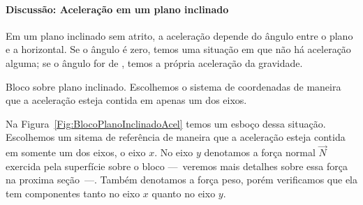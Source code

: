 \paragraph{Discussão: Aceleração em um plano inclinado}

Em um plano inclinado sem atrito, a aceleração depende do ângulo entre o plano e a horizontal. Se o ângulo é zero, temos uma situação em que não há aceleração alguma; se o ângulo for de , temos a própria aceleração da gravidade.

\begin{marginfigure}[-3cm]
\centering
{}
\caption{Bloco sobre plano inclinado. Escolhemos o sistema de coordenadas de maneira que a aceleração esteja contida em apenas um dos eixos.\label{Fig:BlocoPlanoInclinadoAcel}}
\end{marginfigure}

Na Figura~\ref{Fig:BlocoPlanoInclinadoAcel} temos um esboço dessa situação. Escolhemos um sitema de referência de maneira que a aceleração esteja contida em somente um dos eixos, o eixo $x$. No eixo $y$ denotamos a força normal $\vec{N}$ exercida pela superfície sobre o bloco ---~veremos mais detalhes sobre essa força na proxima seção~---. Também denotamos a força peso, porém verificamos que ela tem componentes tanto no eixo $x$ quanto no eixo $y$.

